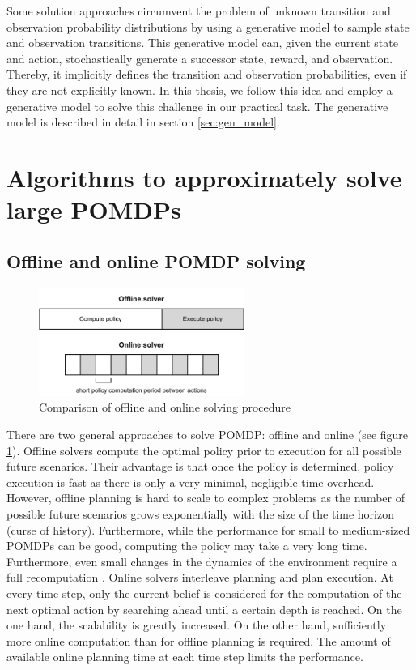 Some solution approaches circumvent the problem of unknown transition and observation probability distributions by using a generative model to sample state and observation transitions. This generative model can, given the current state and action, stochastically generate a successor state, reward, and observation. Thereby, it implicitly defines the transition and observation probabilities, even if they are not explicitly known. In this thesis, we follow this idea and employ a generative model to solve this challenge in our practical task. The generative model is described in detail in section \ref{sec:gen_model}.

\section{Algorithms to approximately solve large POMDPs}

\subsection{Offline and online POMDP solving}
\label{sec:on-off}

\begin{figure}[htbp]
    \centering
    \includegraphics[width=0.6\textwidth]{figures/online-offline.pdf}
    \caption{Comparison of offline and online solving procedure}
    \label{fig:online-offline}
\end{figure}

\noindent
There are two general approaches to solve POMDP: offline and online (see figure \ref{fig:online-offline}). Offline solvers compute the optimal policy prior to execution for all possible future scenarios. Their advantage is that once the policy is determined, policy execution is fast as there is only a very minimal, negligible time overhead. However, offline planning is hard to scale to complex problems as the number of possible future scenarios grows exponentially with the size of the time horizon (curse of history). Furthermore, while the performance for small to medium-sized POMDPs can be good, computing the policy may take a very long time. Furthermore, even small changes in the dynamics of the environment require a full recomputation \parencite{online_pomdp}. Online solvers interleave planning and plan execution. At every time step, only the current belief is considered for the computation of the next optimal action by searching ahead until a certain depth is reached. On the one hand, the scalability is greatly increased. On the other hand, sufficiently more online computation than for offline planning is required. The amount of available online planning time at each time step limits the performance. 

